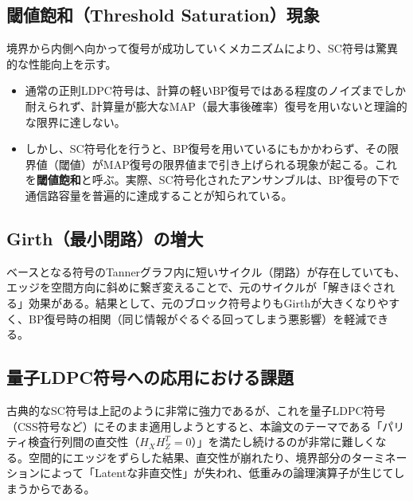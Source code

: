 \documentclass[a4paper,11pt,dvipdfmx]{jsarticle}
\theoremstyle{definition}
\begin{document}
\subsection{閾値飽和（Threshold Saturation）現象}
境界から内側へ向かって復号が成功していくメカニズムにより、SC符号は驚異的な性能向上を示す。

\begin{itemize}
    \item 通常の正則LDPC符号は、計算の軽いBP復号ではある程度のノイズまでしか耐えられず、計算量が膨大なMAP（最大事後確率）復号を用いないと理論的な限界に達しない。
    \item しかし、SC符号化を行うと、BP復号を用いているにもかかわらず、その限界値（閾値）がMAP復号の限界値まで引き上げられる現象が起こる。これを\textbf{閾値飽和}と呼ぶ。実際、SC符号化されたアンサンブルは、BP復号の下で通信路容量を普遍的に達成することが知られている。
\end{itemize}

\subsection{Girth（最小閉路）の増大}
ベースとなる符号のTannerグラフ内に短いサイクル（閉路）が存在していても、エッジを空間方向に斜めに繋ぎ変えることで、元のサイクルが「解きほぐされる」効果がある。結果として、元のブロック符号よりもGirthが大きくなりやすく、BP復号時の相関（同じ情報がぐるぐる回ってしまう悪影響）を軽減できる。

\subsection{量子LDPC符号への応用における課題}
古典的なSC符号は上記のように非常に強力であるが、これを量子LDPC符号（CSS符号など）にそのまま適用しようとすると、本論文のテーマである「パリティ検査行列間の直交性（$H_X H_Z^T = 0$）」を満たし続けるのが非常に難しくなる。空間的にエッジをずらした結果、直交性が崩れたり、境界部分のターミネーションによって「Latentな非直交性」が失われ、低重みの論理演算子が生じてしまうからである。
\end{document}
